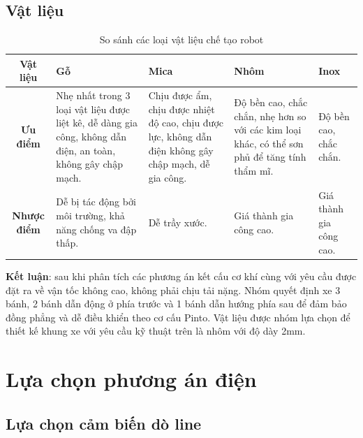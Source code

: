         \subsection{Vật liệu}
            \begin{table}[H]
                \centering
                \begin{tabular}{|c|p{2.8cm}|p{2.8cm}|p{2.8cm}|p{2.8cm}|}
                    \hline
                    \textbf{Vật liệu} & \textbf{Gỗ} & \textbf{Mica} & \textbf{Nhôm} & \textbf{Inox} \\
                    \hline
                    \textbf{Ưu điểm} 
                    & Nhẹ nhất trong 3 loại vật liệu được liệt kê, dễ dàng gia công, không dẫn điện, an toàn, không gây chập mạch.  
                    & Chịu được ẩm, chịu được nhiệt độ cao, chịu được lực, không dẫn điện không gây chập mạch, dễ gia công.
                    & Độ bền cao, chắc chắn, nhẹ hơn so với các kim loại khác, có thể sơn phủ để tăng tính thẩm mĩ.
                    & Độ bền cao, chắc chắn. \\
                    \hline
                    \textbf{Nhược điểm} 
                    & Dễ bị tác động bởi môi trường, khả năng chống va đập thấp.
                    & Dễ trầy xước.
                    & Giá thành gia công cao.
                    & Giá thành gia công cao. \\
                    \hline
                \end{tabular}
                \caption{So sánh các loại vật liệu chế tạo robot}
                \label{tab:label}
            \end{table}
        \hspace*{0.6cm}\textbf{Kết luận}: sau khi phân tích các phương án kết cấu cơ khí cùng với yêu cầu được đặt ra về vận tốc không cao, không phải chịu tải nặng. Nhóm quyết định xe 3 bánh, 2 bánh dẫn động ở phía trước và 1 bánh dẫn hướng phía sau để đảm bảo đồng phẳng và dễ điều khiển theo cơ cấu Pinto. Vật liệu được nhóm lựa chọn để thiết kế khung xe với yêu cầu kỹ thuật trên là nhôm với độ dày 2mm. 
    \section{Lựa chọn phương án điện}
        \subsection{Lựa chọn cảm biến dò line}
